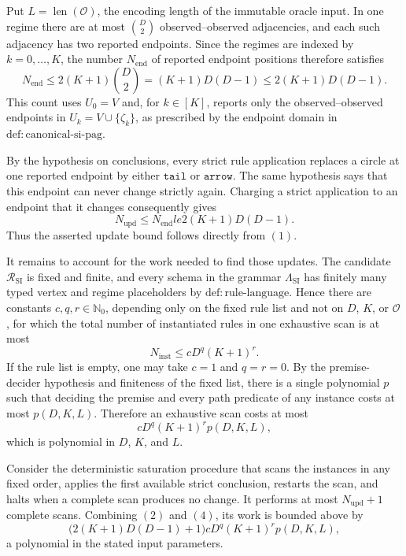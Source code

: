 Put \(L=\operatorname{len}(\mathcal O)\), the encoding length of the immutable oracle input.  In one regime there are at most \(\binom D2\) observed--observed adjacencies, and each such adjacency has two reported endpoints.  Since the regimes are indexed by \(k=0,\ldots,K\), the number \(N_{\mathrm{end}}\) of reported endpoint positions therefore satisfies
\[
N_{\mathrm{end}}
 \le 2(K+1)\binom D2
 = (K+1)D(D-1)
 \le 2(K+1)D(D-1).
\tag{1}
\]
This count uses \(U_0=V\) and, for \(k\in[K]\), reports only the observed--observed endpoints in \(U_k=V\cup\{\zeta_k\}\), as prescribed by the endpoint domain in \(\mathrm{def:canonical\mbox{-}si\mbox{-}pag}\).

By the hypothesis on conclusions, every strict rule application replaces a circle at one reported endpoint by either \(\mathtt{tail}\) or \(\mathtt{arrow}\).  The same hypothesis says that this endpoint can never change strictly again.  Charging a strict application to an endpoint that it changes consequently gives
\[
N_{\mathrm{upd}}\le N_{\mathrm{end}}le 2(K+1)D(D-1).
\tag{2}
\]
Thus the asserted update bound follows directly from \((1)\).

It remains to account for the work needed to find those updates.  The candidate \(\mathcal R_{\mathrm{SI}}\) is fixed and finite, and every schema in the grammar \(\Lambda_{\mathrm{SI}}\) has finitely many typed vertex and regime placeholders by \(\mathrm{def:rule\mbox{-}language}\).  Hence there are constants \(c,q,r\in\mathbb N_0\), depending only on the fixed rule list and not on \(D\), \(K\), or \(\mathcal O\), for which the total number of instantiated rules in one exhaustive scan is at most
\[
N_{\mathrm{inst}}\le cD^q(K+1)^r.
\tag{3}
\]
If the rule list is empty, one may take \(c=1\) and \(q=r=0\).  By the premise-decider hypothesis and finiteness of the fixed list, there is a single polynomial \(p\) such that deciding the premise and every path predicate of any instance costs at most \(p(D,K,L)\).  Therefore an exhaustive scan costs at most
\[
cD^q(K+1)^r p(D,K,L),
\tag{4}
\]
which is polynomial in \(D\), \(K\), and \(L\).

Consider the deterministic saturation procedure that scans the instances in any fixed order, applies the first available strict conclusion, restarts the scan, and halts when a complete scan produces no change.  It performs at most \(N_{\mathrm{upd}}+1\) complete scans.  Combining \((2)\) and \((4)\), its work is bounded above by
\[
\bigl(2(K+1)D(D-1)+1\bigr)cD^q(K+1)^r p(D,K,L),
\tag{5}
\]
a polynomial in the stated input parameters.

